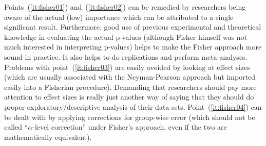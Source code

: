 Points~(\ref{it:fisher01}) and~(\ref{it:fisher02}) can be remedied by researchers being aware of the actual (low) importance which can be attributed to a single significant result.
Furthermore, good use of previous experimental and theoretical knowledge in evaluating the actual p-values (although Fisher himself was not much interested in interpreting p-values) helps to make the Fisher approach more sound in practice.
It also helps to do replications and perform meta-analyses.
Problems with point~(\ref{it:fisher03}) are easily avoided by looking at effect sizes (which are usually associated with the Neyman-Pearson approach but imported easily into a Fisherian procedure).
Demanding that researchers should pay more attention to effect sizes is really just another way of saying that they should do proper exploratory\slash descriptive analysis of their data sets.
Point~(\ref{it:fisher04}) can be dealt with by applying corrections for group-wise error (which should not be called ``$\alpha$-level correction'' under Fisher's approach, even if the two are mathematically equivalent).


